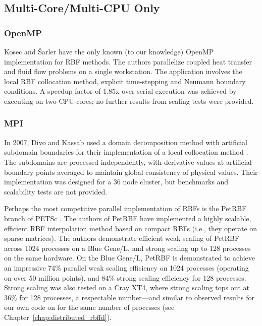 \documentclass[11pt]{report}
\begin{document}
\subsection{Multi-Core/Multi-CPU Only}

\subsubsection{OpenMP}

Kosec and \v{S}arler \cite{Kosec2008} have the only known (to our knowledge) OpenMP implementation for RBF methods. The authors parallelize coupled heat transfer 
and fluid flow problems on a single workstation. 
The application involves the local RBF collocation method, explicit time-stepping and Neumann boundary conditions. A speedup 
factor of 1.85x over serial execution was achieved by executing on two CPU cores; no further 
results from scaling tests were provided. 

\subsubsection{MPI}

In 2007, Divo and Kassab \cite{Divo2007} used a domain decomposition method with artificial 
subdomain boundaries for their implementation of a local collocation method \cite{Divo2007}. 
The subdomains are processed independently, with derivative values 
at artificial boundary points averaged to maintain global consistency of physical values. Their implementation 
was designed for a 36 node cluster, but benchmarks and scalability tests are not provided.

Perhaps the most competitive parallel implementation of RBFs is the PetRBF branch of PETSc \cite{Yokota2010}. The authors of PetRBF have implemented a highly scalable, efficient RBF interpolation method based on compact RBFs (i.e., they operate on sparse matrices). The authors demonstrate efficient weak scaling of PetRBF across 1024 processes on a Blue Gene/L, and strong scaling up to 128 processes on the same hardware. On the Blue Gene/L, PetRBF is demonstrated to achieve an impressive 74\% parallel weak scaling efficiency on 1024 processes (operating on over 50 million points), and 84\% strong scaling efficiency for 128 processes. Strong scaling was also tested on a Cray XT4, where strong scaling tops out at 36\% for 128 processes, a respectable number---and similar to observed results for our own code on for the same number of processes (see Chapter~\ref{chap:distributed_rbffd}).  
\end{document}
